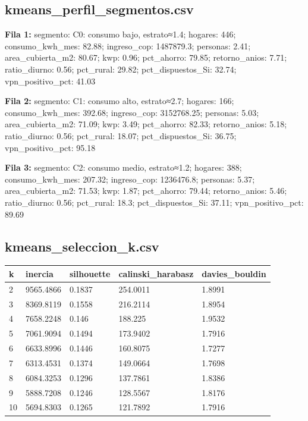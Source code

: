 \subsection*{kmeans\_perfil\_segmentos.csv}
{\footnotesize\textbf{Fila 1:} segmento: C0: consumo bajo, estrato≈1.4; hogares: 446; consumo\_kwh\_mes: 82.88; ingreso\_cop: 1487879.3; personas: 2.41; area\_cubierta\_m2: 80.67; kwp: 0.96; pct\_ahorro: 79.85; retorno\_anios: 7.71; ratio\_diurno: 0.56; pct\_rural: 29.82; pct\_dispuestos\_Si: 32.74; vpn\_positivo\_pct: 41.03\par}
{\footnotesize\textbf{Fila 2:} segmento: C1: consumo alto, estrato≈2.7; hogares: 166; consumo\_kwh\_mes: 392.68; ingreso\_cop: 3152768.25; personas: 5.03; area\_cubierta\_m2: 71.09; kwp: 3.49; pct\_ahorro: 82.33; retorno\_anios: 5.18; ratio\_diurno: 0.56; pct\_rural: 18.07; pct\_dispuestos\_Si: 36.75; vpn\_positivo\_pct: 95.18\par}
{\footnotesize\textbf{Fila 3:} segmento: C2: consumo medio, estrato≈1.2; hogares: 388; consumo\_kwh\_mes: 207.32; ingreso\_cop: 1236476.8; personas: 5.37; area\_cubierta\_m2: 71.53; kwp: 1.87; pct\_ahorro: 79.44; retorno\_anios: 5.46; ratio\_diurno: 0.56; pct\_rural: 18.3; pct\_dispuestos\_Si: 37.11; vpn\_positivo\_pct: 89.69\par}
\subsection*{kmeans\_seleccion\_k.csv}
{\footnotesize\begin{longtable}{@{}lllll@{}}
\toprule
k & inercia & silhouette & calinski\_harabasz & davies\_bouldin \\
\midrule\endhead
2 & 9565.4866 & 0.1837 & 254.0011 & 1.8991 \\
3 & 8369.8119 & 0.1558 & 216.2114 & 1.8954 \\
4 & 7658.2248 & 0.146 & 188.225 & 1.9532 \\
5 & 7061.9094 & 0.1494 & 173.9402 & 1.7916 \\
6 & 6633.8996 & 0.1446 & 160.8075 & 1.7277 \\
7 & 6313.4531 & 0.1374 & 149.0664 & 1.7698 \\
8 & 6084.3253 & 0.1296 & 137.7861 & 1.8386 \\
9 & 5888.7208 & 0.1246 & 128.5567 & 1.8176 \\
10 & 5694.8303 & 0.1265 & 121.7892 & 1.7916 \\
\bottomrule
\end{longtable}}
